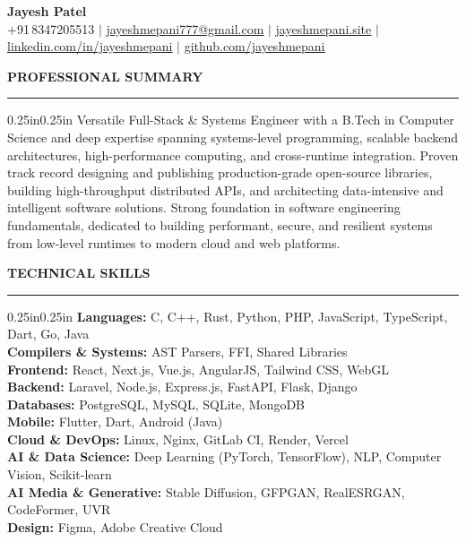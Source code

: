 \documentclass[11pt,a4paper]{article}
\newcommand{\cvlink}[2]{\textcolor{linkblue}{\underline{\href{#1}{#2}}}}
\newcommand{\cvsection}[1]{%
    \vspace{10pt}
    \noindent\textbf{\large\MakeUppercase{#1}}
    \vspace{3pt}
    \hrule
    \vspace{5pt}
}
\begin{document}
\begin{center}
{\Huge\textbf{Jayesh Patel}}\\[5pt]
+91\,8347205513 \; $|$ \;
\cvlink{mailto:jayeshmepani777@gmail.com}{jayeshmepani777@gmail.com} \; $|$ \;
\cvlink{https://jayeshmepani.site/}{jayeshmepani.site} \; $|$ \;
\cvlink{https://linkedin.com/in/jayeshmepani/}{linkedin.com/in/jayeshmepani} \; $|$ \;
\cvlink{https://github.com/jayeshmepani/}{github.com/jayeshmepani}
\end{center}

\cvsection{Professional Summary}
\begin{adjustwidth}{0.25in}{0.25in}
Versatile Full-Stack \& Systems Engineer with a B.Tech in Computer Science and deep expertise spanning systems-level programming, scalable backend architectures, high-performance computing, and cross-runtime integration. Proven track record designing and publishing production-grade open-source libraries, building high-throughput distributed APIs, and architecting data-intensive and intelligent software solutions. Strong foundation in software engineering fundamentals, dedicated to building performant, secure, and resilient systems from low-level runtimes to modern cloud and web platforms.
\end{adjustwidth}

\cvsection{Technical Skills}
\begin{adjustwidth}{0.25in}{0.25in}
\textbf{Languages:} C, C++, Rust, Python, PHP, JavaScript, TypeScript, Dart, Go, Java \\
\textbf{Compilers \& Systems:} AST Parsers, FFI, Shared Libraries \\
\textbf{Frontend:} React, Next.js, Vue.js, AngularJS, Tailwind CSS, WebGL \\
\textbf{Backend:} Laravel, Node.js, Express.js, FastAPI, Flask, Django \\
\textbf{Databases:} PostgreSQL, MySQL, SQLite, MongoDB \\
\textbf{Mobile:} Flutter, Dart, Android (Java) \\
\textbf{Cloud \& DevOps:} Linux, Nginx, GitLab CI, Render, Vercel \\
\textbf{AI \& Data Science:} Deep Learning (PyTorch, TensorFlow), NLP, Computer Vision, Scikit-learn \\
\textbf{AI Media \& Generative:} Stable Diffusion, GFPGAN, RealESRGAN, CodeFormer, UVR \\
\textbf{Design:} Figma, Adobe Creative Cloud
\end{adjustwidth}
\end{document}
